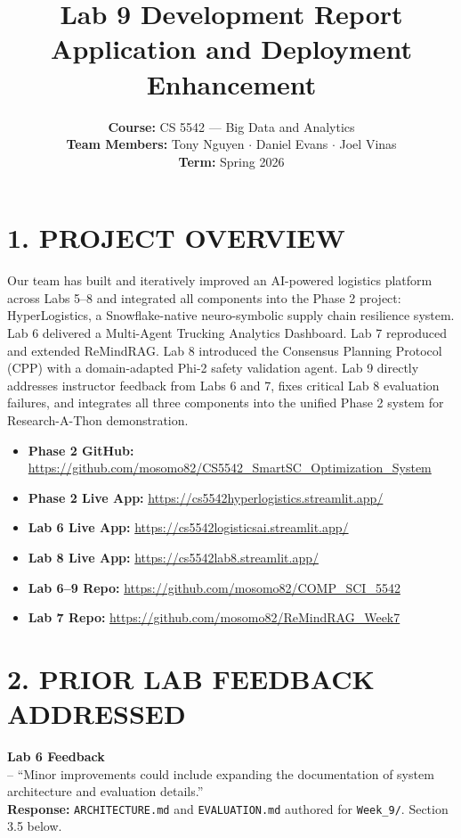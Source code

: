 \documentclass[11pt, letterpaper]{article}
\title{\textbf{Lab 9 Development Report}\\ \Large Application and Deployment Enhancement}
\author{
    \textbf{Course:} CS 5542 — Big Data and Analytics \\
    \textbf{Team Members:} Tony Nguyen $\cdot$ Daniel Evans $\cdot$ Joel Vinas \\
    \textbf{Term:} Spring 2026
}
\date{\vspace{-5ex}}
\begin{document}
\maketitle

\section{1. PROJECT OVERVIEW}
Our team has built and iteratively improved an AI-powered logistics platform across Labs 5--8 and integrated all components into the Phase 2 project: HyperLogistics, a Snowflake-native neuro-symbolic supply chain resilience system. Lab 6 delivered a Multi-Agent Trucking Analytics Dashboard. Lab 7 reproduced and extended ReMindRAG. Lab 8 introduced the Consensus Planning Protocol (CPP) with a domain-adapted Phi-2 safety validation agent. Lab 9 directly addresses instructor feedback from Labs 6 and 7, fixes critical Lab 8 evaluation failures, and integrates all three components into the unified Phase 2 system for Research-A-Thon demonstration.

\begin{itemize}[leftmargin=*]
    \setlength\itemsep{0em}
    \item \textbf{Phase 2 GitHub:} \url{https://github.com/mosomo82/CS5542_SmartSC_Optimization_System}
    \item \textbf{Phase 2 Live App:} \url{https://cs5542hyperlogistics.streamlit.app/}
    \item \textbf{Lab 6 Live App:} \url{https://cs5542logisticsai.streamlit.app/}
    \item \textbf{Lab 8 Live App:} \url{https://cs5542lab8.streamlit.app/}
    \item \textbf{Lab 6--9 Repo:} \url{https://github.com/mosomo82/COMP_SCI_5542}
    \item \textbf{Lab 7 Repo:} \url{https://github.com/mosomo82/ReMindRAG_Week7}
\end{itemize}

\section{2. PRIOR LAB FEEDBACK ADDRESSED}

\textbf{Lab 6 Feedback} \\
-- ``Minor improvements could include expanding the documentation of system architecture and evaluation details.'' \\
\textbf{Response:} \texttt{ARCHITECTURE.md} and \texttt{EVALUATION.md} authored for \texttt{Week\_9/}. Section 3.5 below.
\end{document}
